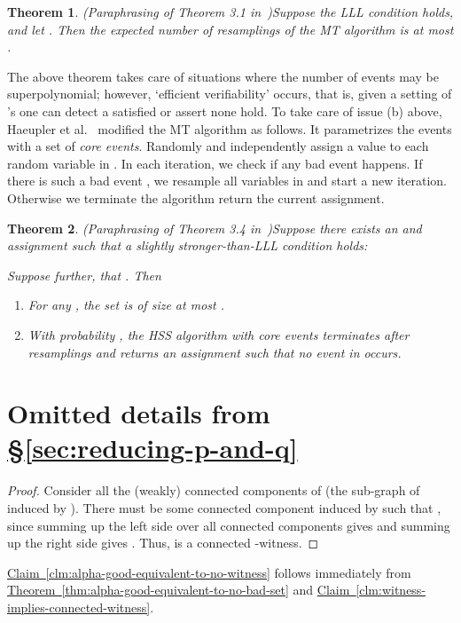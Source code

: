 \documentclass[11pt]{article}
\newtheorem{theorem}{Theorem} \newtheorem{lemma}{Lemma}[section]
\newcommand{\Sec}[1]{\texorpdfstring{\hyperref[sec:#1]{\S\ref*{sec:#1}}}{\S\ref*{sec:#1}}} \newcommand{\Eqn}[1]{\texorpdfstring{\hyperref[eq:#1]{(\ref*{eq:#1})}}{(\ref*{eq:#1})}} \newcommand{\Thm}[1]{\texorpdfstring{\hyperref[thm:#1]{Theorem~\ref*{thm:#1}}}{Theorem~\ref*{thm:#1}}} \newcommand{\Lem}[1]{\texorpdfstring{\hyperref[lem:#1]{Lemma~\ref*{lem:#1}}}{Lemma~\ref*{lem:#1}}} \newcommand{\Def}[1]{\texorpdfstring{\hyperref[def:#1]{Definition~\ref*{def:#1}}}{Definition~\ref*{def:#1}}} \newcommand{\Clm}[1]{\texorpdfstring{\hyperref[clm:#1]{Claim~\ref*{clm:#1}}}{Claim~\ref*{clm:#1}}} \newcommand{\App}[1]{\hyperref[app:#1]{Appendix~\ref*{app:#1}}}
\begin{document}
\begin{theorem}(Paraphrasing of Theorem 3.1 in~\cite{HSS11})\label{thm:hss-1}
Suppose the LLL condition holds, and let . Then the expected number of resamplings of the MT algorithm is at most 
.
\end{theorem}

The above theorem takes care of situations where the number of events may be superpolynomial; however, `efficient verifiability' occurs, that is, given a setting of 's one can detect a satisfied   or assert none hold.
To take care of issue (b) above, Haeupler et al.~\cite{HSS11} modified the MT algorithm as follows. It parametrizes the events 
with a set  of {\em core events}. Randomly and independently assign a value to each random variable in .  In each iteration, we check if any bad event  happens. If there is such a bad event , we resample all variables in  and start a new iteration. Otherwise we terminate the algorithm return the current assignment.  


\begin{theorem}(Paraphrasing of Theorem 3.4 in~\cite{HSS11})\label{thm:hss-2}
Suppose there exists an  and assignment  such that a slightly stronger-than-LLL condition holds:

Suppose further, that . Then 
\begin{enumerate}
\item For any , the set  is of size at most .
\item With probability , the HSS algorithm with core events  terminates after  resamplings and returns an assignment such that no event in  occurs.
\end{enumerate} 
\end{theorem}




\section{Omitted details from \Sec{reducing-p-and-q}}
\label{app:reducing-p-and-q}
\connectedwitness*
\begin{proof}
Consider all the (weakly) connected components of (the sub-graph of  induced by ). There must be some connected component induced by  such that , since summing up the left side over all connected components  gives  and summing up the right side gives . Thus,  is a connected -witness.
\end{proof}

\Clm{alpha-good-equivalent-to-no-witness} follows
immediately from \Thm{alpha-good-equivalent-to-no-bad-set} and \Clm{witness-implies-connected-witness}.
\end{document}
